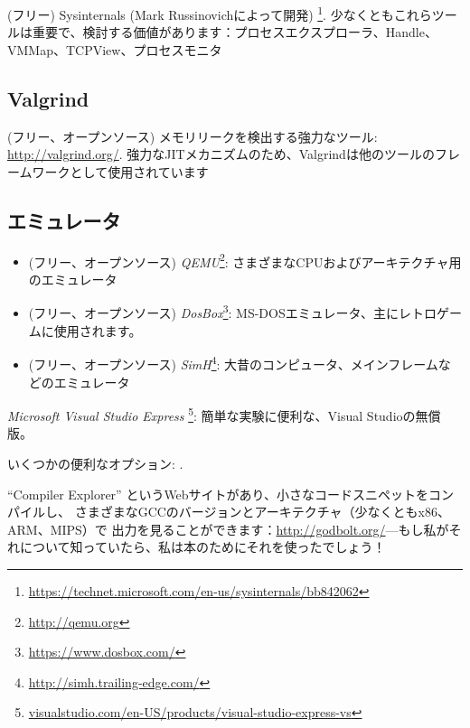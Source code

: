 (フリー) Sysinternals (Mark Russinovichによって開発)
\footnote{\url{https://technet.microsoft.com/en-us/sysinternals/bb842062}}.
少なくともこれらツールは重要で、検討する価値があります：プロセスエクスプローラ、Handle、VMMap、TCPView、プロセスモニタ

\subsection{Valgrind}

(フリー、オープンソース) メモリリークを検出する強力なツール: \url{http://valgrind.org/}.
強力な\ac{JIT}メカニズムのため、Valgrindは他のツールのフレームワークとして使用されています


\subsection{エミュレータ}

\begin{itemize}
\item (フリー、オープンソース) \emph{QEMU}\footnote{\url{http://qemu.org}}: さまざまなCPUおよびアーキテクチャ用のエミュレータ

\item (フリー、オープンソース) \emph{DosBox}\footnote{\url{https://www.dosbox.com/}}: MS-DOSエミュレータ、主にレトロゲームに使用されます。

\item (フリー、オープンソース) \emph{SimH}\footnote{\url{http://simh.trailing-edge.com/}}: 大昔のコンピュータ、メインフレームなどのエミュレータ
\end{itemize}


\emph{Microsoft Visual Studio Express}
\footnote{\href{http://go.yurichev.com/17034}{visualstudio.com/en-US/products/visual-studio-express-vs}}:
簡単な実験に便利な、Visual Studioの無償版。

いくつかの便利なオプション: .

``Compiler Explorer'' というWebサイトがあり、小さなコードスニペットをコンパイルし、
さまざまなGCCのバージョンとアーキテクチャ（少なくともx86、ARM、MIPS）で
出力を見ることができます：\url{http://godbolt.org/}---もし私がそれについて知っていたら、私は本のためにそれを使ったでしょう！


